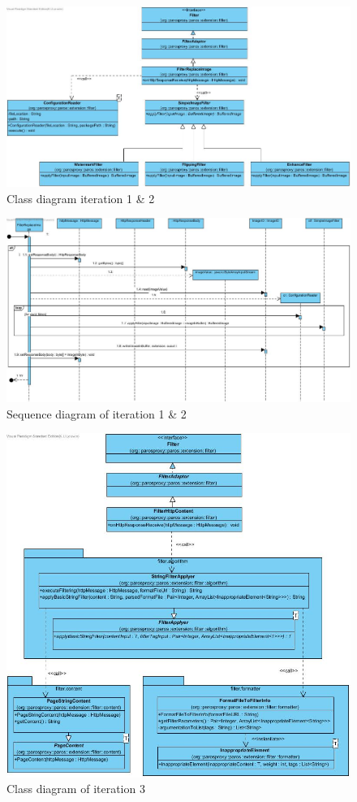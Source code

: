 
\begin{figure}[h]
\centering
\includegraphics[width=1\textwidth]{../Diagrams/CDiteration1and2}
\caption{Class diagram iteration 1 \& 2}
\end{figure}

\begin{figure}[h]
	\centering
	\includegraphics[width=1\textwidth]{../Diagrams/SDiteration1and2}
	\caption{Sequence diagram of iteration 1 \& 2}
\end{figure}

\begin{figure}[h]
	\centering
	\includegraphics[width=1\textwidth]{../Diagrams/CDiteration3}
	\caption{Class diagram of iteration 3}
\end{figure}

